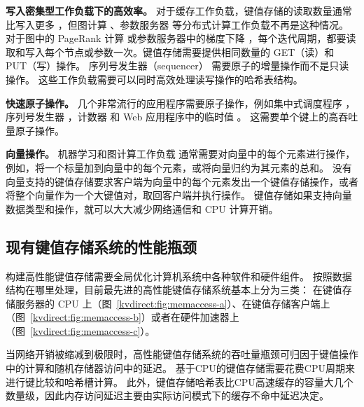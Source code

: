 \textbf {写入密集型工作负载下的高效率。}
对于缓存工作负载，键值存储的读取数量通常比写入更多 \cite {atikoglu2012workload}，但图计算 \cite {page1999pagerank}、参数服务器\cite {li2014scaling} 等分布式计算工作负载不再是这种情况。
对于图中的 PageRank 计算 \cite {page1999pagerank} 或参数服务器中的梯度下降 \cite {li2014scaling}，每个迭代周期，都要读取和写入每个节点或参数一次。键值存储需要提供相同数量的 GET（读）和 PUT（写）操作。
序列号发生器（sequencer）\cite {kalia2016design} 需要原子的增量操作而不是只读操作。
这些工作负载需要可以同时高效处理读写操作的哈希表结构。

\textbf {快速原子操作。}
几个非常流行的应用程序需要原子操作，例如集中式调度程序 \cite {perry2014fastpass}，序列号发生器 \cite {kalia2016design,eris}，计数器 \cite {zhu2015packet} 和 Web 应用程序中的临时值 \cite {atikoglu2012workload}。
这需要单个键上的高吞吐量原子操作。

\textbf {向量操作。}
机器学习和图计算工作负载 \cite {li2014scaling,shao2013trinity,xiao17tux2} 通常需要对向量中的每个元素进行操作，例如，将一个标量加到向量中的每个元素，或将向量归约为其元素的总和。
没有向量支持的键值存储要求客户端为向量中的每个元素发出一个键值存储操作，或者将整个向量作为一个大键值对，取回客户端并执行操作。
键值存储如果支持向量数据类型和操作，就可以大大减少网络通信和 CPU 计算开销。

\subsection{现有键值存储系统的性能瓶颈}
\label{kvdirect:sec:state-of-the-art-kvs}

构建高性能键值存储需要全局优化计算机系统中各种软件和硬件组件。
按照数据结构在哪里处理，目前最先进的高性能键值存储系统基本上分为三类：
在键值存储服务器的 CPU 上（图~\ref{kvdirect:fig:memaccess-a}）、在键值存储客户端上（图~\ref{kvdirect:fig:memaccess-b}）或者在硬件加速器上（图~\ref{kvdirect:fig:memaccess-c}）。


当网络开销被缩减到极限时，高性能键值存储系统的吞吐量瓶颈可归因于键值操作中的计算和随机存储器访问中的延迟。
基于CPU的键值存储需要花费CPU周期来进行键比较和哈希槽计算。
此外，键值存储哈希表比CPU高速缓存的容量大几个数量级，因此内存访问延迟主要由实际访问模式下的缓存不命中延迟决定。


